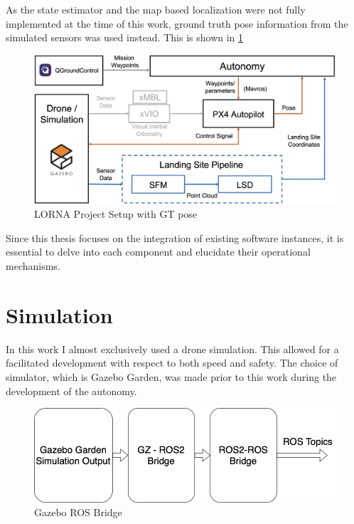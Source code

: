 As the state estimator and the map based localization were not fully implemented at the time of this work, ground truth pose information from the simulated sensors was used instead. This is shown in \cref{fig:lorna_setup_GT_pose}

\begin{figure}[ht]
    \centering
    \includegraphics[scale=0.18]{images/system_overview/setup_flowchart.png}
    \caption{LORNA Project Setup with GT pose}
    \label{fig:lorna_setup_GT_pose}
\end{figure}

Since this thesis focuses on the integration of existing software instances, it is essential to delve into each component and elucidate their operational mechanisms.

\clearpage %
\section{Simulation}\label{sec:simulation}

In this work I almost exclusively used a drone simulation. This allowed for a facilitated development with respect to both speed and safety. The choice of simulator, which is Gazebo Garden, was made prior to this work during the development of the autonomy.

\begin{figure}[ht!]
    \centering
    \includegraphics[scale=0.45]{images/system_overview/GZ_flowchart.png}
    \caption{Gazebo ROS Bridge}
\end{figure}



